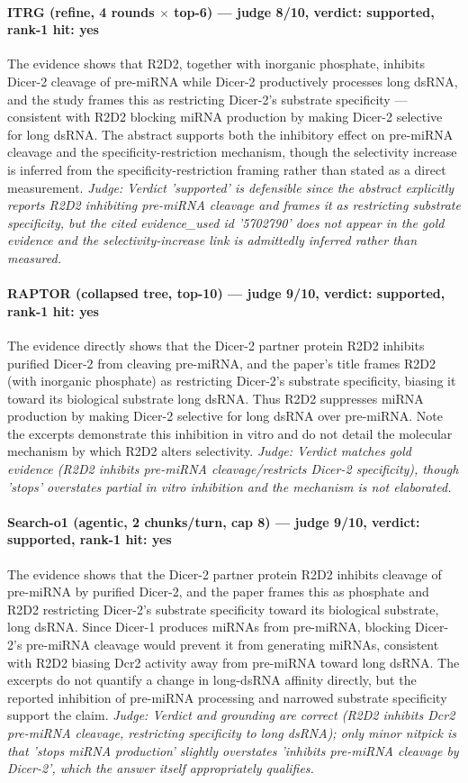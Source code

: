 \documentclass[sigconf, review, anonymous]{acmart}
\begin{document}
\paragraph{ITRG (refine, 4 rounds $\times$ top-6) --- judge 8/10, verdict: supported, rank-1 hit: yes}
\noindent The evidence shows that R2D2, together with inorganic phosphate, inhibits Dicer-2 cleavage of pre-miRNA while Dicer-2 productively processes long dsRNA, and the study frames this as restricting Dicer-2's substrate specificity --- consistent with R2D2 blocking miRNA production by making Dicer-2 selective for long dsRNA. The abstract supports both the inhibitory effect on pre-miRNA cleavage and the specificity-restriction mechanism, though the selectivity increase is inferred from the specificity-restriction framing rather than stated as a direct measurement.
\noindent\small\textit{Judge: Verdict 'supported' is defensible since the abstract explicitly reports R2D2 inhibiting pre-miRNA cleavage and frames it as restricting substrate specificity, but the cited evidence\_used id '5702790' does not appear in the gold evidence and the selectivity-increase link is admittedly inferred rather than measured.}
\paragraph{RAPTOR (collapsed tree, top-10) --- judge 9/10, verdict: supported, rank-1 hit: yes}
\noindent The evidence directly shows that the Dicer-2 partner protein R2D2 inhibits purified Dicer-2 from cleaving pre-miRNA, and the paper's title frames R2D2 (with inorganic phosphate) as restricting Dicer-2's substrate specificity, biasing it toward its biological substrate long dsRNA. Thus R2D2 suppresses miRNA production by making Dicer-2 selective for long dsRNA over pre-miRNA. Note the excerpts demonstrate this inhibition in vitro and do not detail the molecular mechanism by which R2D2 alters selectivity.
\noindent\small\textit{Judge: Verdict matches gold evidence (R2D2 inhibits pre-miRNA cleavage/restricts Dicer-2 specificity), though 'stops' overstates partial in vitro inhibition and the mechanism is not elaborated.}
\paragraph{Search-o1 (agentic, 2 chunks/turn, cap 8) --- judge 9/10, verdict: supported, rank-1 hit: yes}
\noindent The evidence shows that the Dicer-2 partner protein R2D2 inhibits cleavage of pre-miRNA by purified Dicer-2, and the paper frames this as phosphate and R2D2 restricting Dicer-2's substrate specificity toward its biological substrate, long dsRNA. Since Dicer-1 produces miRNAs from pre-miRNA, blocking Dicer-2's pre-miRNA cleavage would prevent it from generating miRNAs, consistent with R2D2 biasing Dcr2 activity away from pre-miRNA toward long dsRNA. The excerpts do not quantify a change in long-dsRNA affinity directly, but the reported inhibition of pre-miRNA processing and narrowed substrate specificity support the claim.
\noindent\small\textit{Judge: Verdict and grounding are correct (R2D2 inhibits Dcr2 pre-miRNA cleavage, restricting specificity to long dsRNA); only minor nitpick is that 'stops miRNA production' slightly overstates 'inhibits pre-miRNA cleavage by Dicer-2', which the answer itself appropriately qualifies.}
\end{document}
